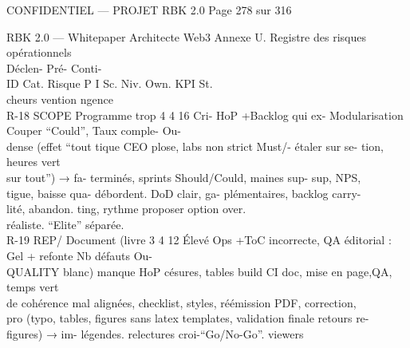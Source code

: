 \documentclass[12pt,landscape,a4paper]{article}
\newenvironment{confidential}
{\begin{tcolorbox}[
    colback=rbkred!5!white,
    colframe=rbkred!75!black,
    title=CONFIDENTIEL,
    fonttitle=\bfseries\color{white},
    coltitle=rbkred!75!black,
    breakable,
    enhanced,
    frame hidden,
    borderline west={2pt}{0pt}{rbkred!75!black}
]}
{\end{tcolorbox}}
\begin{document}
\vspace{0.5em}
\begin{confidential}CONFIDENTIEL — PROJET RBK 2.0                                                                                                Page 278 sur 316\end{confidential}
RBK 2.0 — Whitepaper Architecte Web3                                                                                                           Annexe U. Registre des risques opérationnels\\
\vspace{0.5em}
\vspace{0.5em}
Déclen-           Pré-             Conti-\\
ID     Cat.      Risque            P I Sc. Niv. Own.                                                             KPI            St.\\
cheurs            vention          ngence\\
R-18   SCOPE     Programme trop 4 4 16 Cri- HoP           +Backlog qui ex- Modularisation Couper “Could”, Taux comple- Ou-\\
dense (effet “tout    tique CEO           plose, labs non strict       Must/- étaler sur se- tion, heures vert\\
sur tout”) → fa-                          terminés, sprints Should/Could, maines           sup- sup,     NPS,\\
tigue, baisse qua-                        débordent.        DoD clair, ga- plémentaires,        backlog carry-\\
lité, abandon.                                              ting,     rythme proposer option over.\\
réaliste.        “Elite” séparée.\\
R-19   REP/    Document (livre 3 4 12 Élevé Ops           +ToC incorrecte, QA éditorial : Gel + refonte Nb             défauts Ou-\\
QUALITY blanc) manque                HoP            césures, tables build CI doc, mise en page,QA,               temps vert\\
de      cohérence                           mal     alignées, checklist, styles, réémission PDF, correction,\\
pro (typo, tables,                          figures     sans latex templates, validation finale retours      re-\\
figures) → im-                              légendes.         relectures croi-“Go/No-Go”.        viewers\\
\end{document}
